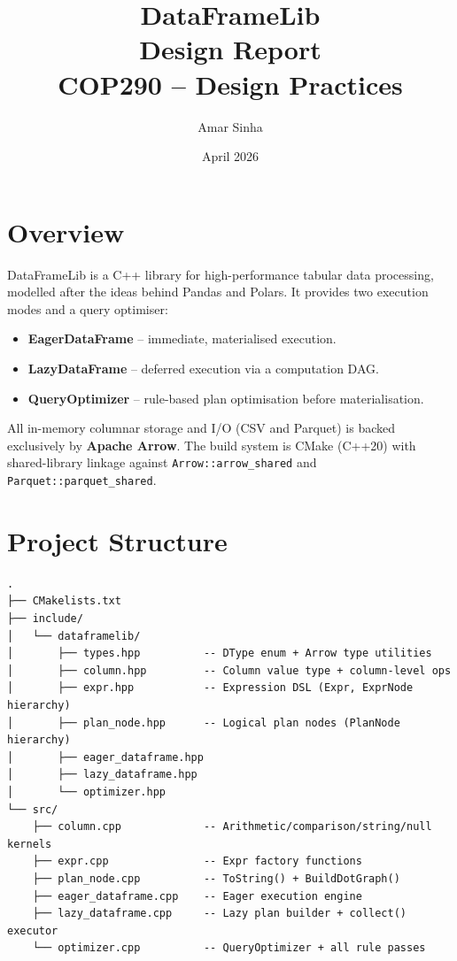 \documentclass[12pt,a4paper]{article}
\title{%
  \Large\textbf{DataFrameLib} \\[0.4em]
  \large Design Report \\[0.2em]
  \normalsize COP290 -- Design Practices
}
\author{Amar Sinha}
\date{April 2026}
\begin{document}
\maketitle
\tableofcontents
\newpage

\section{Overview}

DataFrameLib is a C++ library for high-performance tabular data processing,
modelled after the ideas behind Pandas and Polars.  It provides two
execution modes and a query optimiser:

\begin{itemize}[leftmargin=1.5em]
  \item \textbf{EagerDataFrame} -- immediate, materialised execution.
  \item \textbf{LazyDataFrame} -- deferred execution via a computation DAG.
  \item \textbf{QueryOptimizer} -- rule-based plan optimisation before
        materialisation.
\end{itemize}

All in-memory columnar storage and I/O (CSV and Parquet) is backed
exclusively by \textbf{Apache Arrow}.  The build system is CMake (C++20)
with shared-library linkage against \texttt{Arrow::arrow\_shared} and
\texttt{Parquet::parquet\_shared}.

\section{Project Structure}

\begin{verbatim}
.
├── CMakelists.txt
├── include/
│   └── dataframelib/
│       ├── types.hpp          -- DType enum + Arrow type utilities
│       ├── column.hpp         -- Column value type + column-level ops
│       ├── expr.hpp           -- Expression DSL (Expr, ExprNode hierarchy)
│       ├── plan_node.hpp      -- Logical plan nodes (PlanNode hierarchy)
│       ├── eager_dataframe.hpp
│       ├── lazy_dataframe.hpp
│       └── optimizer.hpp
└── src/
    ├── column.cpp             -- Arithmetic/comparison/string/null kernels
    ├── expr.cpp               -- Expr factory functions
    ├── plan_node.cpp          -- ToString() + BuildDotGraph()
    ├── eager_dataframe.cpp    -- Eager execution engine
    ├── lazy_dataframe.cpp     -- Lazy plan builder + collect() executor
    └── optimizer.cpp          -- QueryOptimizer + all rule passes
\end{verbatim}
\end{document}
